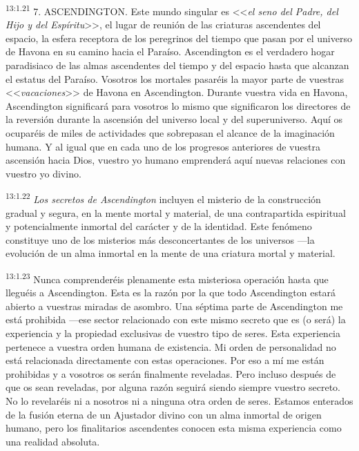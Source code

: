 \par
\textsuperscript{13:1.21} 7. ASCENDINGTON. Este mundo singular es <<\textit{el seno del Padre, del Hijo y del Espíritu}>>, el lugar de reunión de las criaturas ascendentes del espacio, la esfera receptora de los peregrinos del tiempo que pasan por el universo de Havona en su camino hacia el Paraíso. Ascendington es el verdadero hogar paradisiaco de las almas ascendentes del tiempo y del espacio hasta que alcanzan el estatus del Paraíso. Vosotros los mortales pasaréis la mayor parte de vuestras <<\textit{vacaciones}>> de Havona en Ascendington. Durante vuestra vida en Havona, Ascendington significará para vosotros lo mismo que significaron los directores de la reversión durante la ascensión del universo local y del superuniverso. Aquí os ocuparéis de miles de actividades que sobrepasan el alcance de la imaginación humana. Y al igual que en cada uno de los progresos anteriores de vuestra ascensión hacia Dios, vuestro yo humano emprenderá aquí nuevas relaciones con vuestro yo divino.

\par
\textsuperscript{13:1.22} \textit{Los secretos de Ascendington} incluyen el misterio de la construcción gradual y segura, en la mente mortal y material, de una contrapartida espiritual y potencialmente inmortal del carácter y de la identidad. Este fenómeno constituye uno de los misterios más desconcertantes de los universos ---la evolución de un alma inmortal en la mente de una criatura mortal y material.

\par
\textsuperscript{13:1.23} Nunca comprenderéis plenamente esta misteriosa operación hasta que lleguéis a Ascendington. Esta es la razón por la que todo Ascendington estará abierto a vuestras miradas de asombro. Una séptima parte de Ascendington me está prohibida ---ese sector relacionado con este mismo secreto que es (o será) la experiencia y la propiedad exclusivas de vuestro tipo de seres. Esta experiencia pertenece a vuestra orden humana de existencia. Mi orden de personalidad no está relacionada directamente con estas operaciones. Por eso a mí me están prohibidas y a vosotros os serán finalmente reveladas. Pero incluso después de que os sean reveladas, por alguna razón seguirá siendo siempre vuestro secreto. No lo revelaréis ni a nosotros ni a ninguna otra orden de seres. Estamos enterados de la fusión eterna de un Ajustador divino con un alma inmortal de origen humano, pero los finalitarios ascendentes conocen esta misma experiencia como una realidad absoluta.

